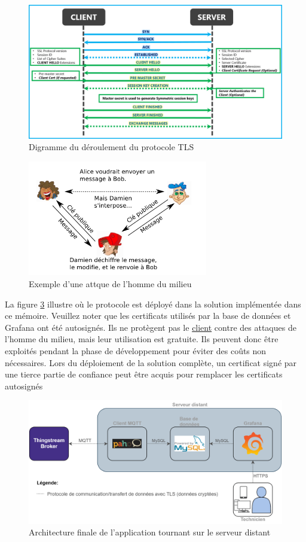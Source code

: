 \begin{figure}[ht!]
  \includegraphics[width=\textwidth]{img/app/ssl.png}
  \caption{Digramme du déroulement du protocole TLS\cite{ssl_img}}
  \label{fig:ssl}
\end{figure}

\begin{figure}[ht!]
  \centering
  \includegraphics[width=0.7\textwidth]{img/app/man_in_the_middle.png}
  \caption{Exemple d'une attque de l'homme du milieu\cite{man_middle_img}}
  \label{fig:middle}
\end{figure}

\noindent
La figure \ref{fig:crypto} illustre où le protocole est déployé dans la solution implémentée dans ce mémoire. Veuillez noter que les certificats utilisés par la base de données et Grafana ont été autosignés. Ils ne protègent pas le \underline{client} contre des attaques de l'homme du milieu, mais leur utilisation est gratuite. Ils peuvent donc être exploités pendant la phase de développement pour éviter des coûts non nécessaires. Lors du déploiement de la solution complète, un certificat signé par une tierce partie de confiance peut être acquis pour remplacer les certificats autosignés


\begin{figure}[ht!]
  \includegraphics[width=\textwidth]{img/app/end_game.png}
  \caption{Architecture finale de l'application tournant sur le serveur distant}
  \label{fig:crypto}
\end{figure}
